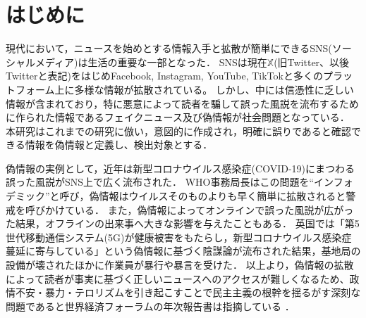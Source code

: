 \chapter{はじめに}
\label{ch:introduction}
現代において，ニュースを始めとする情報入手と拡散が簡単にできるSNS(ソーシャルメディア)は生活の重要な一部となった．
SNSは現在$\mathbb{X}$(旧Twitter、以後Twitterと表記)をはじめFacebook, Instagram, YouTube, TikTokと多くのプラットフォーム上に多様な情報が拡散されている。
しかし、中には信憑性に乏しい情報が含まれており，特に悪意によって読者を騙して誤った風説を流布するために作られた情報であるフェイクニュース及び偽情報が社会問題となっている．
本研究はこれまでの研究\cite{Shu:2017:FND:3137597.3137600,Ruchansky:2017:CHD:3132847.3132877,Wang:2018:EEA:3219819.3219903}に倣い，意図的に作成され，明確に誤りであると確認できる情報を偽情報と定義し、検出対象とする．

偽情報の実例として，近年は新型コロナウイルス感染症(COVID-19)にまつわる誤った風説がSNS上で広く流布された．
WHO事務局長はこの問題を``インフォデミック''と呼び，偽情報はウイルスそのものよりも早く簡単に拡散されると警戒を呼びかけている\cite{ZAROCOSTAS2020676}．
また，偽情報によってオンラインで誤った風説が広がった結果，オフラインの出来事へ大きな影響を与えたこともある．
英国では「第5世代移動通信システム(5G)が健康被害をもたらし，新型コロナウイルス感染症蔓延に寄与している」という偽情報に基づく陰謀論が流布された結果，基地局の設備が壊された\cite{waterson_hern_2020}ほかに作業員が暴行や暴言を受けた\cite{hern_2020}．
以上より，偽情報の拡散によって読者が事実に基づく正しいニュースへのアクセスが難しくなるため、政情不安・暴力・テロリズムを引き起こすことで民主主義の根幹を揺るがす深刻な問題であると世界経済フォーラムの年次報告書は指摘している \cite{mclennan2024global}．

